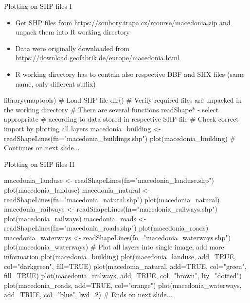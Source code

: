 \documentclass[compress, ucs, xelatex, 11pt, xcolor=svgnames,
  hyperref={
    bookmarks=true,
    unicode=true,
    colorlinks=true,
    pdftitle={Molecular data in R},
    plainpages=false,
    pdfauthor={Vojtech Zeisek},
    pdfsubject={Course about phylogeny and evolution in R},
    pdfcreator={XeLaTeX},
    pdfkeywords={R, evolution, phylogeny, molecular data},
    linkcolor=Tomato,
    anchorcolor=SaddleBrown,
    citecolor=Goldenrod,
    filecolor=DarkMagenta,
    menucolor=Sienna,
    urlcolor=DarkTurquoise,
    pdftex},
  url={hyphens, lowtilde} %
  ]{beamer}
\begin{document}
\begin{frame}[fragile]{Plotting on SHP files I}
  \begin{itemize}
    \item Get SHP files from \url{https://soubory.trapa.cz/rcourse/macedonia.zip} and unpack them into R working directory
    \item Data were originally downloaded from \url{https://download.geofabrik.de/europe/macedonia.html}
    \item R working directory has to contain also respective DBF and SHX files (same name, only different suffix)
  \end{itemize}
  \begin{spluscode}
    library(maptools)
    # Load SHP file
    dir() # Verify required files are unpacked in the working directory
    # There are several functions readShape* - select appropriate
    # according to data stored in respective SHP file
    # Check correct import by plotting all layers
    macedonia_building <- readShapeLines(fn="macedonia_buildings.shp")
    plot(macedonia_building) # Continues on next slide...
  \end{spluscode}
\end{frame}

\begin{frame}[fragile]{Plotting on SHP files II}
  \begin{spluscode}
    macedonia_landuse <- readShapeLines(fn="macedonia_landuse.shp")
    plot(macedonia_landuse)
    macedonia_natural <- readShapeLines(fn="macedonia_natural.shp")
    plot(macedonia_natural)
    macedonia_railways <- readShapeLines(fn="macedonia_railways.shp")
    plot(macedonia_railways)
    macedonia_roads <- readShapeLines(fn="macedonia_roads.shp")
    plot(macedonia_roads)
    macedonia_waterways <- readShapeLines(fn="macedonia_waterways.shp")
    plot(macedonia_waterways)
    # Plot all layers into single image, add more information
    plot(macedonia_building)
    plot(macedonia_landuse, add=TRUE, col="darkgreen", fill=TRUE)
    plot(macedonia_natural, add=TRUE, col="green", fill=TRUE)
    plot(macedonia_railways, add=TRUE, col="brown", lty="dotted")
    plot(macedonia_roads, add=TRUE, col="orange")
    plot(macedonia_waterways, add=TRUE, col="blue", lwd=2)
    # Ends on next slide...
  \end{spluscode}
\end{frame}
\end{document}
